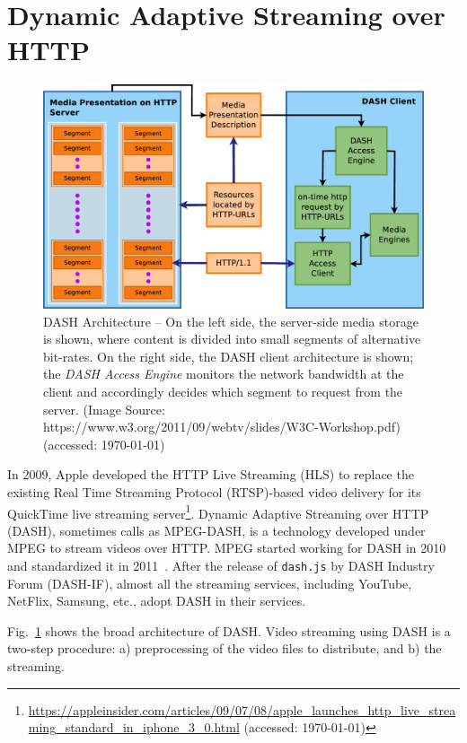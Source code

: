\section{Dynamic Adaptive Streaming over HTTP}
\begin{figure}[!t]
	\centering
	\includegraphics[scale=0.25]{img/dash-arch}
	\caption{\small{DASH Architecture -- On the left side, the server-side media storage is shown, where content is divided into small segments of alternative bit-rates. On the right side, the DASH client architecture is shown; the {\it DASH Access Engine} monitors the network bandwidth at the client and accordingly decides which segment to request from the server. (Image Source: https://www.w3.org/2011/09/webtv/slides/W3C-Workshop.pdf) (accessed: \today)}}
	\label{fig:dash}
\end{figure}
In 2009, Apple developed the HTTP Live Streaming (HLS) to replace the existing Real Time Streaming Protocol (RTSP)-based video delivery for its QuickTime live streaming server\footnote{\url{https://appleinsider.com/articles/09/07/08/apple_launches_http_live_streaming_standard_in_iphone_3_0.html} (accessed: \today)}. Dynamic Adaptive Streaming over HTTP (DASH), sometimes calls as MPEG-DASH, is a technology developed under MPEG to stream videos over HTTP. MPEG started working for DASH in 2010 and standardized it in 2011~\cite{ISO/IEC23009-1:2019}. After the release of {\tt dash.js} by DASH Industry Forum (DASH-IF), almost all the streaming services, including YouTube, NetFlix, Samsung, etc., adopt DASH in their services.

Fig.~\ref{fig:dash} shows the broad architecture of DASH. Video streaming using DASH is a two-step procedure: a) preprocessing of the video files to distribute, and b) the streaming. 


